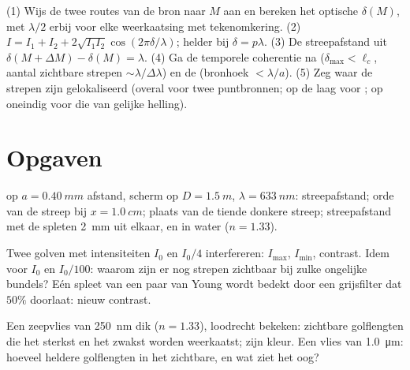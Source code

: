 \begin{method}\label{met:b2:two-wave-interference:method}
(1) Wijs de twee routes van de bron naar $M$ aan en bereken het
optische  $\delta(M)$, met $\lambda/2$ erbij voor elke weerkaatsing
met tekenomkering. (2) $I = I_1 + I_2 + 2\sqrt{I_1I_2}\cos(2\pi\delta/\lambda)$;
helder bij $\delta = p\lambda$. (3) De streepafstand uit
$\delta(M + \Delta M) - \delta(M) =
\lambda$. (4) Ga de temporele coherentie
na ($\delta_{\max} < \ell_c$, aantal
zichtbare strepen $\sim\lambda/\Delta\lambda$) en de 
(bronhoek
$< \lambda/a$). (5) Zeg waar de strepen zijn gelokaliseerd (overal voor twee
puntbronnen; op de laag voor ; op oneindig
voor die van gelijke helling).
\end{method}

\section{Opgaven}

\begin{exercise}[$\star$]\label{exo:b2:two-wave-interference:1}
 op $a = \qty{0.40}{mm}$ afstand, scherm op
$D = \qty{1.5}{m}$, $\lambda =
\qty{633}{nm}$: streepafstand; orde van de
streep bij $x = \qty{1.0}{cm}$; plaats
van de tiende donkere streep; streepafstand met de spleten \qty{2}{mm} uit elkaar,
en in water ($n = 1.33$).
\end{exercise}

\begin{exercise}[$\star$]\label{exo:b2:two-wave-interference:2}
Twee golven met intensiteiten $I_0$ en $I_0/4$ interfereren: $I_{\max}$, $I_{\min}$,
contrast. Idem voor $I_0$ en $I_0/100$: waarom zijn er nog strepen zichtbaar
bij zulke ongelijke bundels? Eén spleet van een paar van Young wordt bedekt
door een grijsfilter dat $50\%$ doorlaat: nieuw contrast.
\end{exercise}

\begin{exercise}[$\star$]\label{exo:b2:two-wave-interference:3}
Een zeepvlies van \qty{250}{nm} dik ($n = 1.33$), loodrecht bekeken:
zichtbare golflengten die het sterkst en het zwakst worden weerkaatst; zijn
kleur. Een vlies van
\qty{1.0}{\micro m}: hoeveel heldere golflengten in het zichtbare, en wat
ziet het oog?
\end{exercise}

